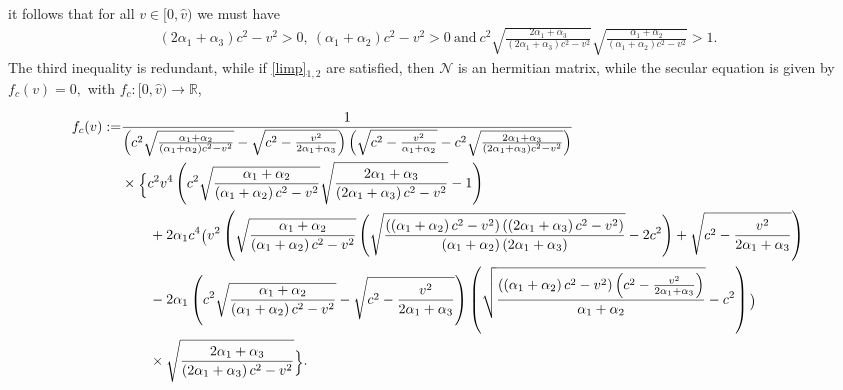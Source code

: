 \documentclass[10pt]{article}
\begin{document}
it follows that for all $v\in[0,\widehat{v})$ we must have
\begin{align}\label{limp}
	\left(2 \alpha _1+\alpha _3\right) c^2-v^2>0,\   \left(\alpha _1+\alpha _2\right) c^2-v^2>0 \ \text{and} \ c^2 \sqrt{\frac{2 \alpha _1+\alpha _3}{\left(2 \alpha _1+\alpha _3\right) c^2-v^2}} \sqrt{\frac{\alpha _1+\alpha _2}{\left(\alpha _1+\alpha _2\right) c^2-v^2}}>1.
\end{align}
The third inequality is redundant, while if \eqref{limp}$_{1,2}$ are satisfied, then $\boldsymbol{\mathcal{N}}$ is an hermitian matrix, while the secular equation
is given by
$
	f_c(v)=0,
$
with $f_c:[0,\widehat{v})\to \mathbb{R}$,
\begin{footnotesize}
\begin{align}
	f_c(v):=&\begin{footnotesize}\frac{1}{\left(c^2 \sqrt{\frac{\alpha _1+\alpha _2}{\left(\alpha _1+\alpha _2\right) c^2-v^2}}-\sqrt{c^2-\frac{v^2}{2 \alpha _1+\alpha _3}}\right) \left(\sqrt{c^2-\frac{v^2}{\alpha _1+\alpha _2}}-c^2 \sqrt{\frac{2 \alpha _1+\alpha _3}{\left(2 \alpha _1+\alpha _3\right) c^2-v^2}}\right)}\end{footnotesize}\notag\\
	& \begin{tiny}\times \Bigg\{c^2 v^4 \left(c^2 \sqrt{\frac{\alpha _1+\alpha _2}{\left(\alpha _1+\alpha _2\right) c^2-v^2}} \sqrt{\frac{2 \alpha _1+\alpha _3}{\left(2 \alpha _1+\alpha _3\right) c^2-v^2}}-1\right)\end{tiny}\notag\\&\qquad \begin{tiny}+2 \alpha _1 c^4 \Big(v^2 \left(\sqrt{\frac{\alpha _1+\alpha _2}{\left(\alpha _1+\alpha _2\right) c^2-v^2}} \left(\sqrt{\frac{\left(\left(\alpha _1+\alpha _2\right) c^2-v^2\right) \left(\left(2 \alpha _1+\alpha _3\right) c^2-v^2\right)}{\left(\alpha _1+\alpha _2\right) \left(2 \alpha _1+\alpha _3\right)}}-2 c^2\right) +\sqrt{c^2-\frac{v^2}{2 \alpha _1+\alpha _3}}\right)\end{tiny}\notag\\
	&\qquad \begin{tiny}-2 \alpha _1 \left(c^2 \sqrt{\frac{\alpha _1+\alpha _2}{\left(\alpha _1+\alpha _2\right) c^2-v^2}}-\sqrt{c^2-\frac{v^2}{2 \alpha _1+\alpha _3}}\right) \left(\sqrt{\frac{\left(\left(\alpha _1+\alpha _2\right) c^2-v^2\right) \left(c^2-\frac{v^2}{2 \alpha _1+\alpha _3}\right)}{\alpha _1+\alpha _2}}-c^2\right)\Big) \end{tiny}\\&\qquad \begin{tiny}\times \sqrt{\frac{2 \alpha _1+\alpha _3}{\left(2 \alpha _1+\alpha _3\right) c^2-v^2}}\Bigg\}\end{tiny}.\notag
\end{align}
\end{footnotesize}
\end{document}

